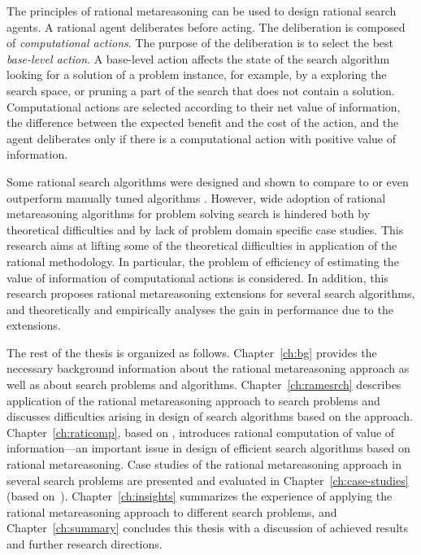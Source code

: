 The principles of rational metareasoning \cite{Russell.right} can be
used to design rational search agents. A rational agent deliberates
before acting. The deliberation is composed of {\em computational
  actions}. The purpose of the deliberation is to select the best {\em
  base-level action}. A base-level action affects the state of the
search algorithm looking for a solution of a problem instance, for
example, by a exploring the search space, or pruning a part of the
search that does not contain a solution. Computational actions are
selected according to their net value of information, the difference
between the expected benefit and the cost of the action, and the agent
deliberates only if there is a computational action with positive
value of information.

Some rational search algorithms were designed and shown to compare to
or even outperform manually tuned algorithms
\cite{Russell.right}. However, wide adoption of rational metareasoning
algorithms for problem solving search is hindered both by theoretical
difficulties and by lack of problem domain specific case studies. This
research aims at lifting some of the theoretical difficulties in
application of the rational methodology. In particular, the problem of
efficiency of estimating the value of information of computational
actions is considered. In addition, this research proposes rational
metareasoning extensions for several search algorithms, and
theoretically and empirically analyses the gain in performance due to
the extensions.

The rest of the thesis is organized as follows. Chapter~\ref{ch:bg}
provides the necessary background information about the rational
metareasoning approach as well as about search problems and
algorithms. Chapter~\ref{ch:ramesrch} describes application of the
rational metareasoning approach to search problems and discusses
difficulties arising in design of search algorithms based on the
approach. Chapter~\ref{ch:raticomp}, based
on \cite{TolpinShimony.raticomp}, introduces rational computation of
value of information---an important issue in design of efficient
search algorithms based on rational metareasoning. Case studies of the
rational metareasoning approach in several search problems are
presented and evaluated in Chapter~\ref{ch:case-studies} (based
on~\cite{TolpinShimony.csp,TolpinShimony.mcts,HayRussellTolpinShimony.selecting,TolpinEtAl.rla}). Chapter~\ref{ch:insights}
summarizes the experience of applying the rational metareasoning
approach to different search problems, and Chapter~\ref{ch:summary}
concludes this thesis with a discussion of achieved results and
further research directions.
